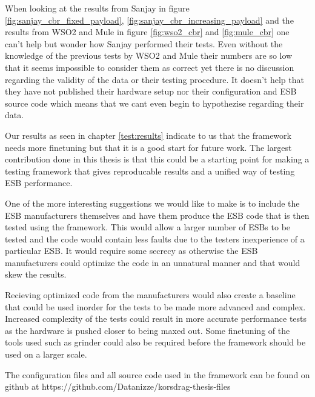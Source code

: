When looking at the results from Sanjay \cite{Sanjay2011} in figure \ref{fig:sanjay_cbr_fixed_payload}, \ref{fig:sanjay_cbr_increasing_payload} and the results from WSO2 and Mule \cite{Perera07R3,mulesoft08} in figure \ref{fig:wso2_cbr} and \ref{fig:mule_cbr} one can't help but wonder how Sanjay performed their tests.
Even without the knowledge of the previous tests by WSO2 and Mule their numbers are so low that it seems impossible to consider them as correct yet there is no discussion regarding the validity of the data or their testing procedure. 
It doesn't help that they have not published their hardware setup nor their configuration and ESB source code which means that we cant even begin to hypothezise regarding their data. 


Our results as seen in chapter \ref{test:results} indicate to us that the framework needs more finetuning but that it is a good start for future work. 
The largest contribution done in this thesis is that this could be a starting point for making a testing framework that gives reproducable results and a unified way of testing ESB performance.


One of the more interesting suggestions we would like to make is to include the ESB manufacturers themselves and have them produce the ESB code that is then tested using the framework. 
This would allow a larger number of ESBs to be tested and the code would contain less faults due to the testers inexperience of a particular ESB. 
It would require some secrecy as otherwise the ESB manufacturers could optimize the code in an unnatural manner and that would skew the results.

Recieving optimized code from the manufacturers would also create a baseline that could be used inorder for the tests to be made more advanced and complex.
Increased complexity of the tests could result in more accurate performance tests as the hardware is pushed closer to being maxed out.
Some finetuning of the tools used such as grinder could also be required before the framework should be used on a larger scale.

The configuration files and all source code used in the framework can be found on github at https://github.com/Datanizze/korsdrag-thesis-files